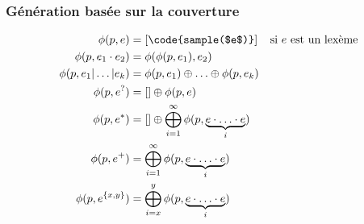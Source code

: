 \subsubsection{Génération basée sur la couverture}
\label{subsection:data:coverage_based_generation}

\begin{align*}
%
\phi(p, e) & =
    [\code{sample($e$)}]
    &
    \text{si $e$ est un lexème}
    \\
%
\phi(p, e_1 \cdot e_2) & =
    \phi(\phi(p, e_1), e_2)
    \\
%
\phi(p, e_1 \vert \dotso \vert e_k) & =
    \phi(p, e_1) \oplus \dotso \oplus \phi(p, e_k)
    \\
%
\phi(p, e^?) & =
    [] \oplus \phi(p, e)
    \\
%
\phi(p, e^*) & =
    [] \oplus \bigoplus_{i = 1}^\infty
    \phi(p, \underbrace{e \cdot \dotso \cdot e}_i)
    \\
%
\phi(p, e^+) & =
    \bigoplus_{i = 1}^\infty \phi(p, \underbrace{e \cdot \dotso \cdot e}_i)
    \\
%
\phi(p, e^{\{x, y\}}) & =
    \bigoplus_{i = x}^y \phi(p, \underbrace{e \cdot \dotso \cdot e}_i)
%
\end{align*}
